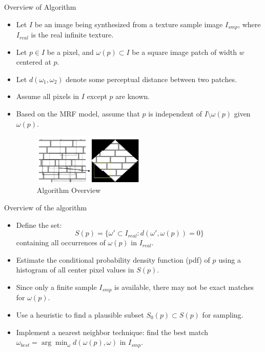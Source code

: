\documentclass{beamer}
\begin{document}
\begin{frame}{Overview of Algorithm}
    \begin{itemize}
    \item Let \( I \) be an image being synthesized from a texture sample image \( I_{smp} \), where \( I_{real} \) is the real infinite texture.
    \item Let \( p \in I \) be a pixel, and \( \omega(p) \subset I \) be a square image patch of width \( w \) centered at \( p \).
    \item Let \( d(\omega_1, \omega_2) \) denote some perceptual distance between two patches.
    \item Assume all pixels in \( I \) except \( p \) are known.
    \item Based on the MRF model, assume that \( p \) is independent of \( I \setminus \omega(p) \) given \( \omega(p) \).
    \begin{figure}[h]
        \centering
        \includegraphics[width=0.5\textwidth]{Paper picture.png} %
        \caption{Algorithm Overview}
    \end{figure}
    
\end{itemize}

\end{frame}

\begin{frame}{Overview of the algorithm}
    \begin{itemize}
    
    \item Define the set:
          \[
          S(p) = \{\omega' \subset I_{real} : d(\omega', \omega(p)) = 0\}
          \]
          containing all occurrences of \( \omega(p) \) in \( I_{real} \).
          
        \item Estimate the conditional probability density function (pdf) of \( p \) using a histogram of all center pixel values in \( S(p) \).
    \item Since only a finite sample \( I_{smp} \) is available, there may not be exact matches for \( \omega(p) \).
    \item Use a heuristic to find a plausible subset \( S_0(p) \subset S(p) \) for sampling.
    \item Implement a nearest neighbor technique: find the best match \( \omega_{best} = \arg\min_{\omega} d(\omega(p), \omega) \) in \( I_{smp} \).
   
    \end{itemize}
    
\end{frame}
\end{document}
